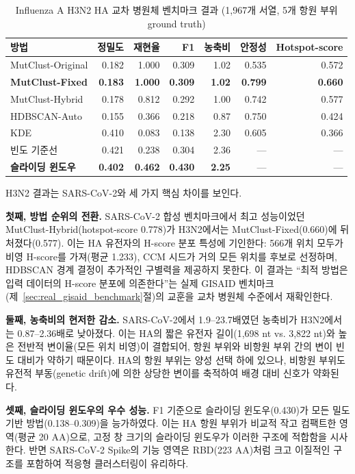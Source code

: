 \begin{table}[htbp]
\centering
\caption{Influenza A H3N2 HA 교차 병원체 벤치마크 결과 (1,967개 서열, 5개 항원 부위 ground truth)}
\label{tab:influenza}
\begin{tabular}{lrrrrrr}
\toprule
\textbf{방법} & \textbf{정밀도} & \textbf{재현율} & \textbf{F1} & \textbf{농축비} & \textbf{안정성} & \textbf{Hotspot-score} \\
\midrule
MutClust-Original & 0.182 & 1.000 & 0.309 & 1.02 & 0.535 & 0.572 \\
\textbf{MutClust-Fixed} & \textbf{0.183} & \textbf{1.000} & \textbf{0.309} & \textbf{1.02} & \textbf{0.799} & \textbf{0.660} \\
MutClust-Hybrid & 0.178 & 0.812 & 0.292 & 1.00 & 0.742 & 0.577 \\
HDBSCAN-Auto & 0.155 & 0.366 & 0.218 & 0.87 & 0.750 & 0.424 \\
KDE & 0.410 & 0.083 & 0.138 & 2.30 & 0.605 & 0.366 \\
\midrule
빈도 기준선 & 0.421 & 0.238 & 0.304 & 2.36 & --- & --- \\
\textbf{슬라이딩 윈도우} & \textbf{0.402} & \textbf{0.462} & \textbf{0.430} & \textbf{2.25} & --- & --- \\
\bottomrule
\end{tabular}
\end{table}

H3N2 결과는 SARS-CoV-2와 세 가지 핵심 차이를 보인다.

\textbf{첫째, 방법 순위의 전환.}
SARS-CoV-2 합성 벤치마크에서 최고 성능이었던 MutClust-Hybrid(hotspot-score 0.778)가 H3N2에서는 MutClust-Fixed(0.660)에 뒤처졌다(0.577).
이는 HA 유전자의 H-score 분포 특성에 기인한다: 566개 위치 모두가 비영 H-score를 가져(평균 1.233), CCM 시드가 거의 모든 위치를 후보로 선정하며, HDBSCAN 경계 결정이 추가적인 구별력을 제공하지 못한다.
이 결과는 ``최적 방법은 입력 데이터의 H-score 분포에 의존한다''는 실제 GISAID 벤치마크(제~\ref{sec:real_gisaid_benchmark}절)의 교훈을 교차 병원체 수준에서 재확인한다.

\textbf{둘째, 농축비의 현저한 감소.}
SARS-CoV-2에서 1.9--23.7배였던 농축비가 H3N2에서는 0.87--2.36배로 낮아졌다.
이는 HA의 짧은 유전자 길이(1,698 nt vs. 3,822 nt)와 높은 전반적 변이율(모든 위치 비영)이 결합되어, 항원 부위와 비항원 부위 간의 변이 빈도 대비가 약하기 때문이다.
HA의 항원 부위는 양성 선택 하에 있으나, 비항원 부위도 유전적 부동(genetic drift)에 의한 상당한 변이를 축적하여 배경 대비 신호가 약화된다.

\textbf{셋째, 슬라이딩 윈도우의 우수 성능.}
F1 기준으로 슬라이딩 윈도우(0.430)가 모든 밀도 기반 방법(0.138--0.309)을 능가하였다.
이는 HA 항원 부위가 비교적 작고 컴팩트한 영역(평균 20 AA)으로, 고정 창 크기의 슬라이딩 윈도우가 이러한 구조에 적합함을 시사한다.
반면 SARS-CoV-2 Spike의 기능 영역은 RBD(223 AA)처럼 크고 이질적인 구조를 포함하여 적응형 클러스터링이 유리하다.

